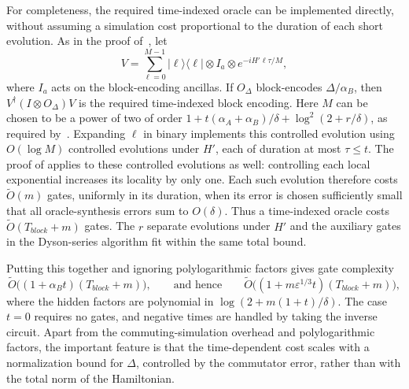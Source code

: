 \documentclass[a4paper,onecolumn,11pt]{quantumarticle}
\theoremstyle{plain}
\newcommand{\eps}{\varepsilon}
\begin{document}
    For completeness, the required time-indexed oracle can be implemented directly, without assuming a simulation cost proportional to the duration of each short evolution. As in the proof of~\cite[Theorem~7]{low2018hamiltonian}, let
    \[
    V=\sum_{\ell=0}^{M-1}|\ell\rangle\langle\ell|\otimes I_a\otimes e^{-iH'\ell\tau/M},
    \]
    where $I_a$ acts on the block-encoding ancillas. If $O_\Delta$ block-encodes $\Delta/\alpha_B$, then $V^\dagger(I\otimes O_\Delta)V$ is the required time-indexed block encoding. Here $M$ can be chosen to be a power of two of order $1+t(\alpha_A+\alpha_B)/\delta+\log^2(2+r/\delta)$, as required by~\cite[Lemma~5]{low2018hamiltonian}. Expanding $\ell$ in binary implements this controlled evolution using $O(\log M)$ controlled evolutions under $H'$, each of duration at most $\tau\leq t$. The proof of  applies to these controlled evolutions as well: controlling each local exponential increases its locality by only one. Each such evolution therefore costs $\widetilde O(m)$ gates, uniformly in its duration, when its error is chosen sufficiently small that all oracle-synthesis errors sum to $O(\delta)$. Thus a time-indexed oracle costs $\widetilde O(T_{block}+m)$ gates. The $r$ separate evolutions under $H'$ and the auxiliary gates in the Dyson-series algorithm fit within the same total bound.

    Putting this together and ignoring polylogarithmic factors gives gate complexity
    \[
    \widetilde O\big((1+\alpha_B t)(T_{block}+m)\big),
    \qquad\text{and hence}\qquad
    \widetilde O\big((1+m\eps^{1/3}t)(T_{block}+m)\big),
    \]
    where the hidden factors are polynomial in $\log(2+m(1+t)/\delta)$. The case $t=0$ requires no gates, and negative times are handled by taking the inverse circuit. Apart from the commuting-simulation overhead and polylogarithmic factors, the important feature is that the time-dependent cost scales with a normalization bound for $\Delta$, controlled by the commutator error, rather than with the total norm of the Hamiltonian.
\printbibliography

\appendix
\end{document}
